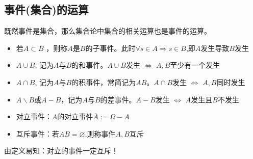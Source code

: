 \subsection*{事件(集合)的运算}
既然事件是集合，那么集合论中集合的相关运算也是事件的运算。

\begin{definition}[事件的运算]
    \begin{itemize}
        \item 若$A \subset B$ ，则称$A$是$B$的子事件。此时$\forall s \in A \Rightarrow s \in B$,即$A$发生导致$B$发生
        \item $A \cup B$, 记为$A$与$B$的和事件。$A \cup B$发生 $\Leftrightarrow$ $A,B$至少有一个发生
        \item $A \cap B$, 记为$A$与$B$的积事件，常简记为$AB$。$A \cap B$发生 $\Leftrightarrow$ $A,B$同时发生
        \item $A \backslash B$或$A-B$，记为$A$与$B$的差事件。$A - B$发生 $\Leftrightarrow$ $A$发生且$B$不发生
        \item 对立事件：$A$的对立事件$\overline{A}:= \Omega - A$
        \item 互斥事件：若$AB=\varnothing$,则称事件$A,B$互斥
    \end{itemize}
\end{definition}
\begin{property}
    由定义易知：对立的事件一定互斥！
\end{property}
